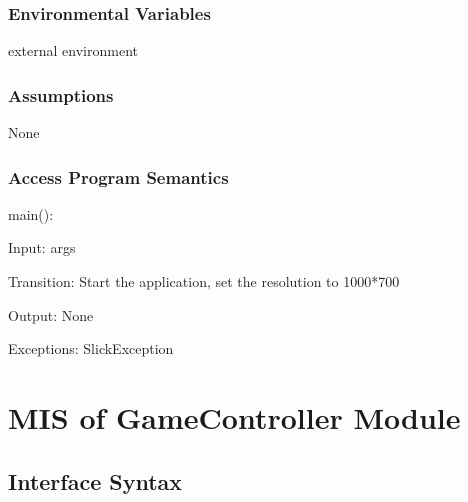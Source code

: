\documentclass[12,english]{article}
\begin{document}
		\subsubsection{Environmental Variables}
		\color{red} external environment \color{black}
		
		\subsubsection{Assumptions}
		None
		
		\subsubsection{Access Program Semantics}
		main():
		
		Input: args
		
		Transition: Start the application, set the resolution to 1000*700
		
		Output: None
		
		Exceptions: SlickException
	
	
	
\section{MIS of GameController Module}
		\subsection{Interface Syntax}
\end{document}
